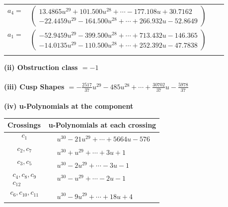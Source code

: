 \documentclass[1p]{elsarticle_modified}
\theoremstyle{definition}
\begin{document}
\begin{tabular}{m{7pt} m{180pt} m{7pt} m{180pt} }
\flushright $a_{4}=$&$\begin{pmatrix}13.4865 u^{29}+101.500 u^{28}+\cdots-177.108 u+30.7162\\-22.4459 u^{29}-164.500 u^{28}+\cdots+266.932 u-52.8649\end{pmatrix}$ \\
\flushright $a_{1}=$&$\begin{pmatrix}-52.9459 u^{29}-399.500 u^{28}+\cdots+713.432 u-146.365\\-14.0135 u^{29}-110.500 u^{28}+\cdots+252.392 u-47.7838\end{pmatrix}$\\&\end{tabular}
\flushleft \textbf{(ii) Obstruction class $= -1$}\\~\\
\flushleft \textbf{(iii) Cusp Shapes $= -\frac{2517}{37} u^{29}-485 u^{28}+\cdots+\frac{30702}{37} u-\frac{5978}{37}$}\\~\\
\newpage\renewcommand{\arraystretch}{1}
\flushleft \textbf{(iv) u-Polynomials at the component}\newline \\
\begin{tabular}{m{50pt}|m{274pt}}
Crossings & \hspace{64pt}u-Polynomials at each crossing \\
\hline $$\begin{aligned}c_{1}\end{aligned}$$&$\begin{aligned}
&u^{30}-21 u^{29}+\cdots+5664 u-576
\end{aligned}$\\
\hline $$\begin{aligned}c_{2},c_{7}\end{aligned}$$&$\begin{aligned}
&u^{30}+u^{29}+\cdots+3 u+1
\end{aligned}$\\
\hline $$\begin{aligned}c_{3},c_{5}\end{aligned}$$&$\begin{aligned}
&u^{30}-2 u^{29}+\cdots-3 u-1
\end{aligned}$\\
\hline $$\begin{aligned}c_{4},c_{8},c_{9}\\c_{12}\end{aligned}$$&$\begin{aligned}
&u^{30}- u^{29}+\cdots-2 u-1
\end{aligned}$\\
\hline $$\begin{aligned}c_{6},c_{10},c_{11}\end{aligned}$$&$\begin{aligned}
&u^{30}-9 u^{29}+\cdots+18 u+4
\end{aligned}$\\
\hline
\end{tabular}\\~\\
\end{document}
